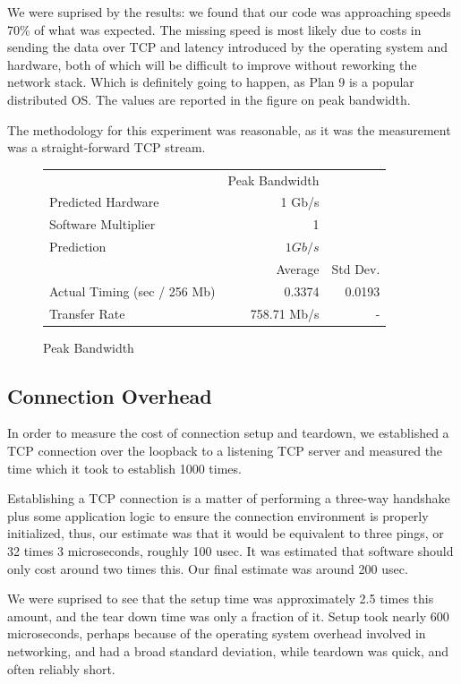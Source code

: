 \documentclass[letterpaper,twocolumn,10pt]{article}
\begin{document}
We were suprised by the results: we found that our code was approaching speeds 70\% of what was expected. The missing speed is most likely due to costs in sending the data over TCP and latency introduced by the operating system and hardware, both of which will be difficult to improve without reworking the network stack. Which is definitely going to happen, as Plan 9 is a popular distributed OS. The values are reported in the figure on peak bandwidth.

The methodology for this experiment was reasonable, as it was the measurement was a straight-forward TCP stream.

\begin{figure}
	\centering
    \begin{tabular}{l r r}
      & Peak Bandwidth \\
      Predicted Hardware & 1 Gb/s\\
      Software Multiplier & 1 \\
      Prediction & $1Gb/s$ \\
                   & Average & Std Dev.\\
        Actual Timing (sec / 256 Mb) & 0.3374&  0.0193 \\
        Transfer Rate & 758.71 Mb/s &  - \\
\end{tabular}
\caption{Peak Bandwidth}
\label{tab:peakbandwidth}
\end{figure}

\subsection{Connection Overhead}

In order to measure the cost of connection setup and teardown, we established a TCP connection over the loopback to a listening TCP server and measured the time which it took to establish 1000 times. 

Establishing a TCP connection is a matter of performing a three-way handshake plus some application logic to ensure the connection environment is properly initialized, thus, our estimate was that it would be equivalent to three pings, or 32 times 3 microseconds, roughly 100 usec. It was estimated that software should only cost around two times this. Our final estimate was around 200 usec.

We were suprised to see that the setup time was approximately 2.5 times this amount, and the tear down time was only a fraction of it. Setup took nearly 600 microseconds, perhaps because of the operating system overhead involved in networking, and had a broad standard deviation, while teardown was quick, and often reliably short.
\end{document}
